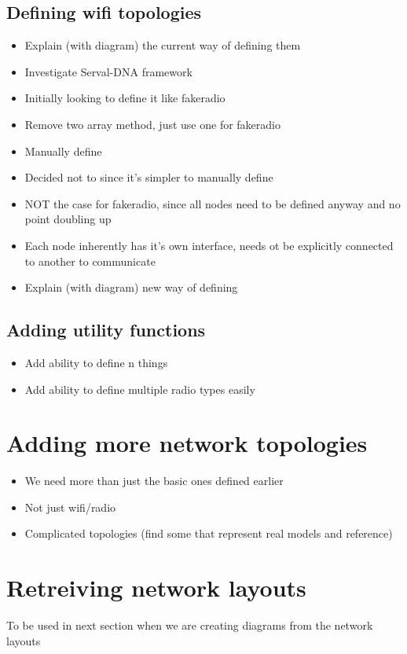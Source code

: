 \subsection{Defining wifi topologies}
\begin{itemize}
    \item Explain (with diagram) the current way of defining them

    \item Investigate Serval-DNA framework
    \item Initially looking to define it like fakeradio
    \item Remove two array method, just use one for fakeradio
    \item Manually define 
    \item Decided not to since it's simpler to manually define
    \item NOT the case for fakeradio, since all nodes need to be defined anyway and no point doubling up
    \item Each node inherently has it's own interface, needs ot be explicitly connected to another to communicate
    \item Explain (with diagram) new way of defining
\end{itemize}

\subsection{Adding utility functions}
\begin{itemize}
    \item Add ability to define {n} things
    \item Add ability to define multiple radio types easily
\end{itemize}


\section{Adding more network topologies}
\begin{itemize}
    \item We need more than just the basic ones defined earlier
    \item Not just wifi/radio
    \item Complicated topologies (find some that represent real models and reference)
\end{itemize}


\section{Retreiving network layouts}
To be used in next section when we are creating diagrams from the network layouts
